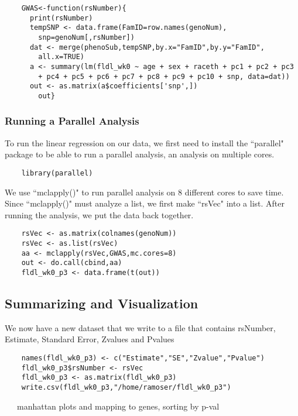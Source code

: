 \documentclass{ar2e}
\begin{document}
\begin{samepage}
\begin{verbatim}
    GWAS<-function(rsNumber){
      print(rsNumber)
      tempSNP <- data.frame(FamID=row.names(genoNum),
        snp=genoNum[,rsNumber])
      dat <- merge(phenoSub,tempSNP,by.x="FamID",by.y="FamID",
        all.x=TRUE)
      a <- summary(lm(fldl_wk0 ~ age + sex + raceth + pc1 + pc2 + pc3 
        + pc4 + pc5 + pc6 + pc7 + pc8 + pc9 + pc10 + snp, data=dat))
      out <- as.matrix(a$coefficients['snp',])
        out}
\end{verbatim}
\end{samepage}
%
\subsubsection{Running a Parallel Analysis}

To run the linear regression on our data, we first need to install the ``parallel" package to be able to run a parallel analysis, an analysis on multiple cores.

\begin{verbatim}
    library(parallel)
\end{verbatim}

We use ``mclapply()" to run parallel analysis on 8 different cores to save time. Since ``mclapply()" must analyze a list, we first make ``rsVec" into a list. After running the analysis, we put the data back together.

\begin{samepage}
\begin{verbatim}
    rsVec <- as.matrix(colnames(genoNum))
    rsVec <- as.list(rsVec)
    aa <- mclapply(rsVec,GWAS,mc.cores=8)
    out <- do.call(cbind,aa)
    fldl_wk0_p3 <- data.frame(t(out))
\end{verbatim}
\end{samepage}

\subsection{Summarizing and Visualization}

We now have a new dataset that we write to a file that contains rsNumber, Estimate, Standard Error, Zvalues and Pvalues

\begin{samepage}
\begin{verbatim}
    names(fldl_wk0_p3) <- c("Estimate","SE","Zvalue","Pvalue")
    fldl_wk0_p3$rsNumber <- rsVec
    fldl_wk0_p3 <- as.matrix(fldl_wk0_p3)
    write.csv(fldl_wk0_p3,"/home/ramoser/fldl_wk0_p3")
\end{verbatim}
\end{samepage}
~~~manhattan plots and mapping to genes, sorting by p-val
\end{document}
